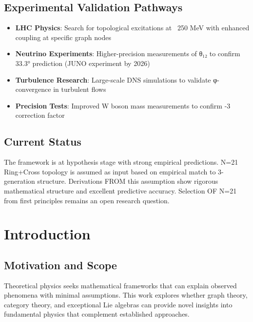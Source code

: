\documentclass[12pt,a4paper]{article}
\begin{document}
\subsection*{Experimental Validation Pathways}
\begin{itemize}
\item \textbf{LHC Physics}: Search for topological excitations at ~250 MeV with enhanced coupling at specific graph nodes
\item \textbf{Neutrino Experiments}: Higher-precision measurements of θ₁₂ to confirm 33.3° prediction (JUNO experiment by 2026)
\item \textbf{Turbulence Research}: Large-scale DNS simulations to validate φ-convergence in turbulent flows
\item \textbf{Precision Tests}: Improved W boson mass measurements to confirm -3 correction factor
\end{itemize}

\subsection*{Current Status}
The framework is at hypothesis stage with strong empirical predictions. N=21 Ring+Cross topology is assumed as input based on empirical match to 3-generation structure. Derivations FROM this assumption show rigorous mathematical structure and excellent predictive accuracy. Selection OF N=21 from first principles remains an open research question.

\section{Introduction}

\subsection{Motivation and Scope}

Theoretical physics seeks mathematical frameworks that can explain observed phenomena with minimal assumptions. This work explores whether graph theory, category theory, and exceptional Lie algebras can provide novel insights into fundamental physics that complement established approaches.
\end{document}
